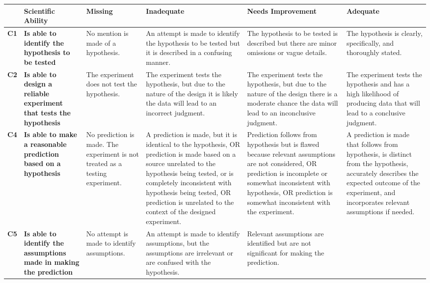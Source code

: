 \begin{landscape}
\begin{longtable}{>{\bfseries}p{0.02\textheight}|>{\bfseries\RaggedRight}p{0.25\textheight}|>{\RaggedRight}p{0.21\textheight}|>{\RaggedRight}p{0.21\textheight}|>{\RaggedRight}p{0.22\textheight}|>{\RaggedRight}p{0.22\textheight}}
	\toprule
	& Scientific Ability
	& Missing & Inadequate & Needs Improvement & Adequate \\ \midrule \endhead
	C1
	& Is able to identify the hypothesis to be tested
	& No mention is made of a hypothesis.
	& An attempt is made to identify the hypothesis to be tested but it is described in a confusing manner.
	& The hypothesis to be tested is described but there are minor omissions or vague details.
	& The hypothesis is clearly, specifically, and thoroughly stated.
	\\ \midrule
	C2
	& Is able to design a reliable experiment that tests the hypothesis
	& The experiment does not test the hypothesis.
	& The experiment tests the hypothesis, but due to the nature of the design it is likely the data will lead to an incorrect judgment.
	& The experiment tests the hypothesis, but due to the nature of the design there is a moderate chance the data will lead to an inconclusive judgment.
	& The experiment tests the hypothesis and has a high likelihood of producing data that will lead to a conclusive judgment.
	\\ \midrule
	C4
	& Is able to make a reasonable prediction based on a hypothesis
	& No prediction is made. The experiment is not treated as a testing experiment.
	& A prediction is made, but it is identical to the hypothesis, OR prediction is made based on a source unrelated to the hypothesis being tested, or is completely inconsistent with hypothesis being tested, OR prediction is unrelated to the context of the designed experiment.
	& Prediction follows from hypothesis but is flawed because relevant assumptions are not considered, OR prediction is incomplete or somewhat inconsistent with hypothesis, OR prediction is somewhat inconsistent with the experiment.
	& A prediction is made that follows from hypothesis, is distinct from the hypothesis, accurately describes the expected outcome of the experiment, and incorporates relevant assumptions if needed.
	\\ \midrule
	C5
	& Is able to identify the assumptions made in making the prediction
	& No attempt is made to identify assumptions.
	& An attempt is made to identify assumptions, but the assumptions are irrelevant or are confused with the hypothesis.
	& Relevant assumptions are identified but are not significant for making the prediction.

\end{longtable}
\end{landscape}
